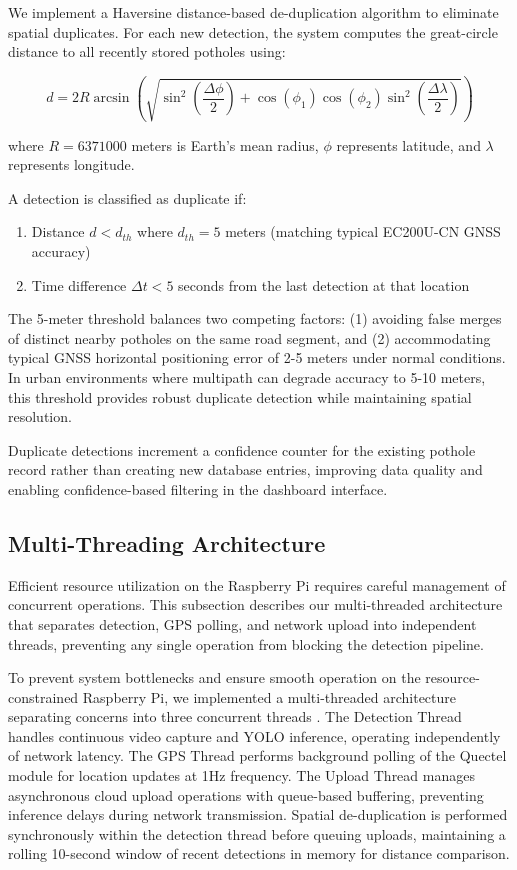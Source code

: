 \documentclass{ieeeaccess}
\begin{document}
We implement a Haversine distance-based de-duplication algorithm to eliminate spatial duplicates. For each new detection, the system computes the great-circle distance to all recently stored potholes using:

\begin{equation}
d = 2R \arcsin\left(\sqrt{\sin^2\left(\frac{\Delta\phi}{2}\right) + \cos(\phi_1)\cos(\phi_2)\sin^2\left(\frac{\Delta\lambda}{2}\right)}\right)
\end{equation}

where $R = 6371000$ meters is Earth's mean radius, $\phi$ represents latitude, and $\lambda$ represents longitude.

A detection is classified as duplicate if:
\begin{enumerate}
    \item Distance $d < d_{th}$ where $d_{th} = 5$ meters (matching typical EC200U-CN GNSS accuracy)
    \item Time difference $\Delta t < 5$ seconds from the last detection at that location
\end{enumerate}

The 5-meter threshold balances two competing factors: (1) avoiding false merges of distinct nearby potholes on the same road segment, and (2) accommodating typical GNSS horizontal positioning error of 2-5 meters under normal conditions. In urban environments where multipath can degrade accuracy to 5-10 meters, this threshold provides robust duplicate detection while maintaining spatial resolution.

Duplicate detections increment a confidence counter for the existing pothole record rather than creating new database entries, improving data quality and enabling confidence-based filtering in the dashboard interface.

\subsection{Multi-Threading Architecture}

Efficient resource utilization on the Raspberry Pi requires careful management of concurrent operations. This subsection describes our multi-threaded architecture that separates detection, GPS polling, and network upload into independent threads, preventing any single operation from blocking the detection pipeline.

To prevent system bottlenecks and ensure smooth operation on the resource-constrained Raspberry Pi, we implemented a multi-threaded architecture separating concerns into three concurrent threads \cite{b11, b18}. The Detection Thread handles continuous video capture and YOLO inference, operating independently of network latency. The GPS Thread performs background polling of the Quectel module for location updates at 1Hz frequency. The Upload Thread manages asynchronous cloud upload operations with queue-based buffering, preventing inference delays during network transmission. Spatial de-duplication is performed synchronously within the detection thread before queuing uploads, maintaining a rolling 10-second window of recent detections in memory for distance comparison.
\end{document}
